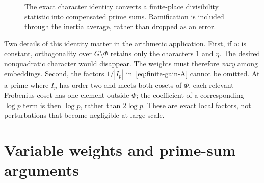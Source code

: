 \documentclass[11pt,openany,oneside]{scrbook}
\theoremstyle{definition}
\theoremstyle{remark}
\begin{document}
\begin{figure}[ht]
\centering
{}
\caption{The exact character identity converts a finite-place divisibility statistic into compensated prime sums. Ramification is included through the inertia average, rather than dropped as an error.}
\label{fig:arith-fourier}
\end{figure}

Two details of this identity matter in the arithmetic application.  First, if $w$ is constant, orthogonality over $G\setminus\Phi$ retains only the characters $1$ and $\eta$.  The desired nonquadratic character would disappear.  The weights must therefore \emph{vary} among embeddings.  Second, the factors $1/|I_p|$ in~\eqref{eq:finite-gain-A} cannot be omitted.  At a prime where $I_p$ has order two and meets both cosets of $\Phi$, each relevant Frobenius coset has one element outside $\Phi$; the coefficient of a corresponding $\log p$ term is then $\log p$, rather than $2\log p$.  These are exact local factors, not perturbations that become negligible at large scale.

\section{Variable weights and prime-sum arguments}\label{sec:variable-weights}
\end{document}
